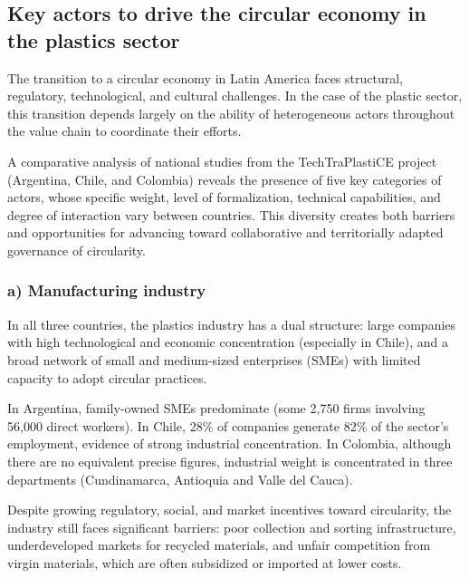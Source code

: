 \documentclass[
  12pt,
  oneside]{book}
\begin{document}
\begin{landscape}
\begin{longtable}[t]{>{\raggedright\arraybackslash}p{3cm}>{\raggedright\arraybackslash}p{8cm}>{\raggedright\arraybackslash}p{2cm}>{\raggedright\arraybackslash}p{2cm}>{\raggedright\arraybackslash}p{2cm}}
\end{longtable}

\endgroup{}

\end{landscape}

\subsection{Key actors to drive the circular economy in the plastics
sector}\label{key-actors-to-drive-the-circular-economy-in-the-plastics-sector}

The transition to a circular economy in Latin America faces structural,
regulatory, technological, and cultural challenges. In the case of the
plastic sector, this transition depends largely on the ability of
heterogeneous actors throughout the value chain to coordinate their
efforts.

A comparative analysis of national studies from the TechTraPlastiCE
project (Argentina, Chile, and Colombia) reveals the presence of five
key categories of actors, whose specific weight, level of formalization,
technical capabilities, and degree of interaction vary between
countries. This diversity creates both barriers and opportunities for
advancing toward collaborative and territorially adapted governance of
circularity.

\subsubsection{a) Manufacturing
industry}\label{a-manufacturing-industry}

In all three countries, the plastics industry has a dual structure:
large companies with high technological and economic concentration
(especially in Chile), and a broad network of small and medium-sized
enterprises (SMEs) with limited capacity to adopt circular practices.

In Argentina, family-owned SMEs predominate (some 2,750 firms involving
56,000 direct workers). In Chile, 28\% of companies generate 82\% of the
sector's employment, evidence of strong industrial concentration. In
Colombia, although there are no equivalent precise figures, industrial
weight is concentrated in three departments (Cundinamarca, Antioquia and
Valle del Cauca).

Despite growing regulatory, social, and market incentives toward
circularity, the industry still faces significant barriers: poor
collection and sorting infrastructure, underdeveloped markets for
recycled materials, and unfair competition from virgin materials, which
are often subsidized or imported at lower costs.
\end{document}
